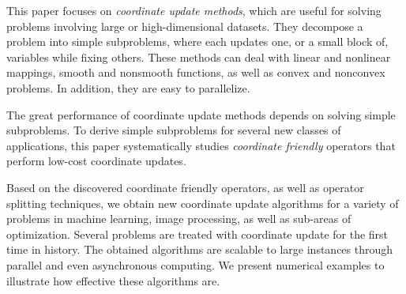 This paper focuses on  \emph{coordinate update methods}, which are useful for solving problems involving large or high-dimensional datasets. They decompose a problem into simple subproblems, where each  updates one, or a small block of, variables while fixing others. These methods can deal with linear and nonlinear mappings,  smooth and nonsmooth functions, as well as convex and nonconvex problems. In addition, they are easy to parallelize.  %

The great performance of coordinate update methods depends on solving simple subproblems. To derive simple subproblems for several new classes of applications, this paper systematically studies  \emph{coordinate friendly} operators that perform low-cost coordinate updates. 


Based on the discovered coordinate friendly operators, as well as operator splitting techniques, we obtain new coordinate update algorithms for a variety of problems in machine learning, image processing, as well as sub-areas of optimization. Several problems are treated with coordinate update for the first time in history. The obtained algorithms are scalable to  large instances through parallel and even asynchronous computing. We present numerical examples to illustrate how effective these algorithms are.

